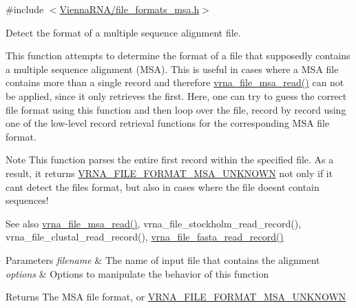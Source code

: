 {\ttfamily \#include $<$\hyperlink{file__formats__msa_8h}{Vienna\+R\+N\+A/file\+\_\+formats\+\_\+msa.\+h}$>$}



Detect the format of a multiple sequence alignment file. 

This function attempts to determine the format of a file that supposedly contains a multiple sequence alignment (M\+SA). This is useful in cases where a M\+SA file contains more than a single record and therefore \hyperlink{group__file__utils_gad02d5d12bda54611c915a1019323b7be}{vrna\+\_\+file\+\_\+msa\+\_\+read()} can not be applied, since it only retrieves the first. Here, one can try to guess the correct file format using this function and then loop over the file, record by record using one of the low-\/level record retrieval functions for the corresponding M\+SA file format.

\begin{DoxyNote}{Note}
This function parses the entire first record within the specified file. As a result, it returns \hyperlink{group__file__utils_gabdc948f547e550125de3e7c65878400c}{V\+R\+N\+A\+\_\+\+F\+I\+L\+E\+\_\+\+F\+O\+R\+M\+A\+T\+\_\+\+M\+S\+A\+\_\+\+U\+N\+K\+N\+O\+WN} not only if it can\textquotesingle{}t detect the file\textquotesingle{}s format, but also in cases where the file doesn\textquotesingle{}t contain sequences!
\end{DoxyNote}
\begin{DoxySeeAlso}{See also}
\hyperlink{group__file__utils_gad02d5d12bda54611c915a1019323b7be}{vrna\+\_\+file\+\_\+msa\+\_\+read()}, vrna\+\_\+file\+\_\+stockholm\+\_\+read\+\_\+record(), vrna\+\_\+file\+\_\+clustal\+\_\+read\+\_\+record(), \hyperlink{file__formats_8h_a8cfb7e271efc9e1f34640acb85475639}{vrna\+\_\+file\+\_\+fasta\+\_\+read\+\_\+record()}
\end{DoxySeeAlso}

\begin{DoxyParams}{Parameters}
{\em filename} & The name of input file that contains the alignment \\
\hline
{\em options} & Options to manipulate the behavior of this function \\
\hline
\end{DoxyParams}
\begin{DoxyReturn}{Returns}
The M\+SA file format, or \hyperlink{group__file__utils_gabdc948f547e550125de3e7c65878400c}{V\+R\+N\+A\+\_\+\+F\+I\+L\+E\+\_\+\+F\+O\+R\+M\+A\+T\+\_\+\+M\+S\+A\+\_\+\+U\+N\+K\+N\+O\+WN} 
\end{DoxyReturn}
